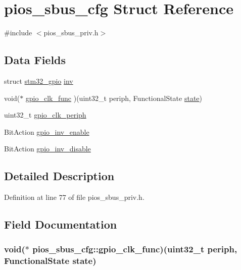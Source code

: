 \hypertarget{structpios__sbus__cfg}{\section{pios\-\_\-sbus\-\_\-cfg \-Struct \-Reference}
\label{structpios__sbus__cfg}
}


{\ttfamily \#include $<$pios\-\_\-sbus\-\_\-priv.\-h$>$}

\subsection*{\-Data \-Fields}
\begin{DoxyCompactItemize}
\item 
struct \hyperlink{structstm32__gpio}{stm32\-\_\-gpio} \hyperlink{structpios__sbus__cfg_af25f459d6167f8ba7a038ae53b458c46}{inv}
\item 
void($\ast$ \hyperlink{structpios__sbus__cfg_a66cb660c4fe8979c218032c477b12a93}{gpio\-\_\-clk\-\_\-func} )(uint32\-\_\-t periph, \-Functional\-State \hyperlink{pios__flashfs__logfs_8c_a13a6109e91ad12705df96a0f2743c630}{state})
\item 
uint32\-\_\-t \hyperlink{structpios__sbus__cfg_af2100d98daffabe98836f12519330975}{gpio\-\_\-clk\-\_\-periph}
\item 
\-Bit\-Action \hyperlink{structpios__sbus__cfg_ab2b1ec166136b6e8ecfc96fa0c1319b5}{gpio\-\_\-inv\-\_\-enable}
\item 
\-Bit\-Action \hyperlink{structpios__sbus__cfg_a843ec7deaae570eeab1dc5770e77dafe}{gpio\-\_\-inv\-\_\-disable}
\end{DoxyCompactItemize}


\subsection{\-Detailed \-Description}


\-Definition at line 77 of file pios\-\_\-sbus\-\_\-priv.\-h.



\subsection{\-Field \-Documentation}
\hypertarget{structpios__sbus__cfg_a66cb660c4fe8979c218032c477b12a93}{
\subsubsection[{gpio\-\_\-clk\-\_\-func}]{\setlength{\rightskip}{0pt plus 5cm}void($\ast$ {\bf pios\-\_\-sbus\-\_\-cfg\-::gpio\-\_\-clk\-\_\-func})(uint32\-\_\-t periph, \-Functional\-State {\bf state})}}\label{structpios__sbus__cfg_a66cb660c4fe8979c218032c477b12a93}



